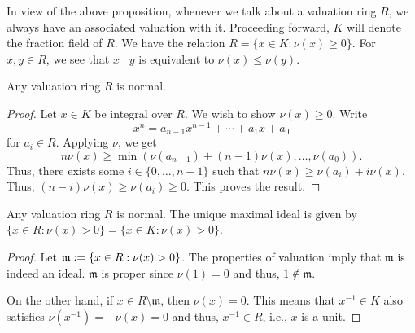 \documentclass[12pt]{article}
\begin{document}
In view of the above proposition, whenever we talk about a valuation ring $R$, we always have an associated valuation with it. Proceeding forward, $K$ will denote the fraction field of $R$. We have the relation $R = \{x \in K : \nu(x) \ge 0\}$. \newline
For $x, y \in R$, we see that $x \mid y$ is equivalent to $\nu(x) \le \nu(y)$.

\begin{prop}
	Any valuation ring $R$ is normal.
\end{prop}
\begin{proof} 
	Let $x \in K$ be integral over $R$. We wish to show $\nu(x) \ge 0$. Write
	\begin{equation*} 
		x^{n} = a_{n - 1} x^{n - 1} + \cdots + a_{1} x + a_{0}
	\end{equation*}
	for $a_{i} \in R$. Applying $\nu$, we get
	\begin{equation*} 
		n \nu(x) \ge \min(\nu(a_{n - 1}) + (n - 1) \nu(x), \ldots, \nu(a_{0})).
	\end{equation*}
	Thus, there exists some $i \in \{0, \ldots, n - 1\}$ such that $n \nu(x) \ge \nu(a_{i}) + i \nu(x)$. Thus, $(n - i) \nu(x) \ge \nu(a_{i}) \ge 0$. This proves the result.
\end{proof}

\begin{prop}
	Any valuation ring $R$ is normal. The unique maximal ideal is given by $\{x\in R : \nu(x) > 0\} = \{x \in K : \nu(x) > 0\}$.
\end{prop}
\begin{proof} 
	Let $\mathfrak{m} \vcentcolon= \{x \in R : \nu(x) > 0\}$. The properties of valuation imply that $\mathfrak{m}$ is indeed an ideal. $\mathfrak{m}$ is proper since $\nu(1) = 0$ and thus, $1 \notin \mathfrak{m}$.

	On the other hand, if $x \in R \setminus \mathfrak{m}$, then $\nu(x) = 0$. This means that $x^{-1} \in K$ also satisfies $\nu(x^{-1}) = -\nu(x) = 0$ and thus, $x^{-1} \in R$, i.e., $x$ is a unit.
\end{proof}
\end{document}
